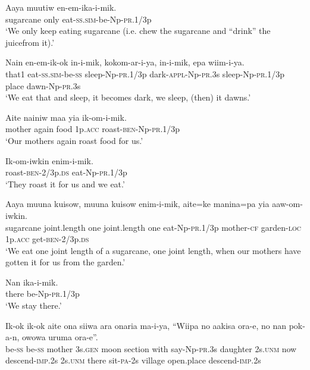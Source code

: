 \ea
\gll  Aaya  muutiw  en-em-ika-i-mik. \\
sugarcane  only  eat-\textsc{ss}.\textsc{sim}-be-Np-\textsc{pr}.1/3p \\
\glt ‘We only keep eating sugarcane (i.e. chew the sugarcane and “drink” the juicefrom it).’ \\
\z


\ea
\gll  Nain  en-em-ik-ok  in-i-mik,  kokom-ar-i-ya,            in-i-mik,  epa  wiim-i-ya. \\
that1  eat-\textsc{ss}.\textsc{sim}-be-\textsc{ss}  sleep-Np-\textsc{pr}.1/3p  dark-\textsc{appl}-Np-\textsc{pr}.3s sleep-Np-\textsc{pr}.1/3p  place  dawn-Np-\textsc{pr}.3s \\


\glt ‘We eat that and sleep, it becomes dark, we sleep, (then) it dawns.’ \\
\z


\ea
\gll  Aite  nainiw  maa  yia  ik-om-i-mik. \\
mother  again  food  1p.\textsc{acc}  roast-\textsc{ben}-Np-\textsc{pr}.1/3p \\
\glt ‘Our mothers again roast food for us.’ \\
\z


\ea
\gll  Ik-om-iwkin  enim-i-mik. \\
roast-\textsc{ben}-2/3p.\textsc{ds}  eat-Np-\textsc{pr}.1/3p \\
\glt ‘They roast it for us and we eat.’ \\
\z


\ea
\gll  Aaya  muuna  kuisow,  muuna  kuisow  enim-i-mik,  aite=ke             manina=pa  yia  aaw-om-iwkin. \\
sugarcane  joint.length  one  joint.length  one  eat-Np-\textsc{pr}.1/3p  mother-\textsc{cf}  garden-\textsc{loc}  1p.\textsc{acc}  get-\textsc{ben}-2/3p.\textsc{ds} \\


\glt ‘We eat one joint length of a sugarcane, one joint length, when our mothers have gotten it for us from the garden.’ \\
\z


\ea
\gll  Nan  ika-i-mik. \\
there  be-Np-\textsc{pr}.1/3p \\
\glt ‘We stay there.’ \\
\z


\ea
\gll  Ik-ok  ik-ok  aite  ona  siiwa  ara  onaria  ma-i-ya,  “Wiipa       no  aakisa  ora-e,  no  nan  pok-a-n,  owowa  uruma                         ora-e”. \\
be-\textsc{ss}  be-\textsc{ss}  mother  3s.\textsc{gen}  moon  section  with  say-Np-\textsc{pr}.3s  daughter 2s.\textsc{unm}  now  descend-\textsc{imp}.2s  2s.\textsc{unm}  there  sit-\textsc{pa}-2s  village  open.place  descend-\textsc{imp}.2s \\




